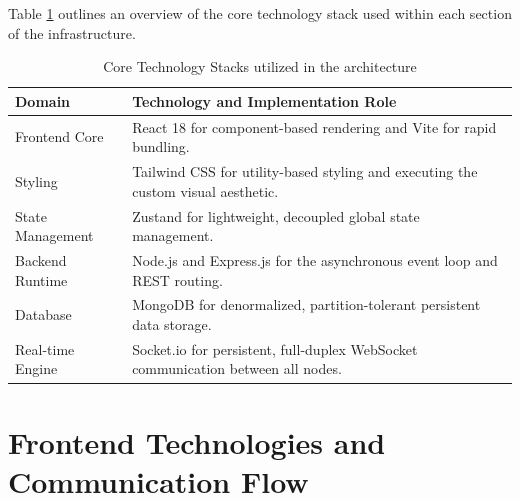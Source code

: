 Table \ref{tab:core_tech} outlines an overview of the core technology stack used within each section of the infrastructure.

\begin{table}[htbp]
\centering
\caption{Core Technology Stacks utilized in the architecture}
\label{tab:core_tech}
\begin{tabular}{|l|p{10cm}|}
\hline
\textbf{Domain} & \textbf{Technology and Implementation Role} \\ \hline
Frontend Core & React 18 for component-based rendering and Vite for rapid bundling. \\ \hline
Styling & Tailwind CSS \cite{tailwind} for utility-based styling and executing the custom visual aesthetic. \\ \hline
State Management & Zustand \cite{zustand} for lightweight, decoupled global state management. \\ \hline
Backend Runtime & Node.js and Express.js \cite{express} for the asynchronous event loop and REST routing. \\ \hline
Database & MongoDB for denormalized, partition-tolerant persistent data storage. \\ \hline
Real-time Engine & Socket.io for persistent, full-duplex WebSocket communication between all nodes. \\ \hline
\end{tabular}
\end{table}

\section{Frontend Technologies and Communication Flow}

